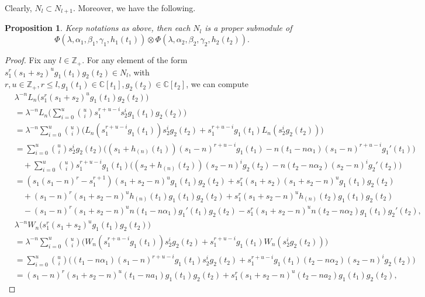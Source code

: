 \documentclass[12pt,leqno,amscd,amsfonts,amssymb]{amsart}
\def\a{\alpha}
\def\b{\beta}
\def\r{\gamma}
\def\Z{\mathbb{Z}}
\def\C{\mathbb{C}}
\numberwithin{equation}{section}
\newtheorem{prop}[theo]{Proposition}
\begin{document}
Clearly, $N_l\subset N_{l+1}$. Moreover, we have the following.
\begin{prop}\label{theo2}
Keep notations as above, then each $N_l$ is a proper submodule of  $$\Phi(\lambda,\a_1,\b_1,\r_1,h_1(t_1))\otimes\Phi(\lambda,\a_2,\b_2,\r_2,h_2(t_2)).$$
\end{prop}
\begin{proof}
Fix any $l\in\Z_+$. For any element of the form $s_1^r(s_1+s_2)^ug_1(t_1)g_2(t_2)\in N_l$, with $r, u\in\Z_+, r\leq l, g_1(t_1)\in\C[t_1], g_2(t_2)\in\C[t_2]$, we can compute
\begin{align*}
&\lambda^{-n} L_n\big( s_1^r (s_1 + s_2)^u g_1(t_1) g_2(t_2) \big)\\
&=\lambda^{-n} L_n \Big( \sum_{i=0}^u \binom{u}{i} s_1^{r+u-i} s_2^i g_1(t_1) g_2(t_2) \Big)\\
&= \lambda^{-n} \sum_{i=0}^u \binom{u}{i} \Big( L_n(s_1^{r+u-i} g_1(t_1)) s_2^i g_2(t_2)+ s_1^{r+u-i} g_1(t_1) L_n(s_2^i g_2(t_2)) \Big)\\
&=\sum_{i=0}^u \binom{u}{i}s_2^i g_2(t_2)\big((s_1+h_{(n)}(t_1))(s_1-n)^{r+u-i}g_1(t_1)-n(t_1-n\a_1)(s_1-n)^{r+u-i}g_1'(t_1)\big)\\
&\quad +\sum_{i=0}^u \binom{u}{i}s_1^{r+u-i}g_1(t_1)\big((s_2+h_{(n)}(t_2))(s_2-n)^{i}g_2(t_2)-n(t_2-n\a_2)(s_2-n)^{i}g_2'(t_2)\big)\\
&= (s_1(s_1 - n)^r-s_1^{r+1}) (s_1 + s_2 - n)^u g_1(t_1) g_2(t_2) + s_1^r (s_1+s_2) (s_1 + s_2 - n)^u g_1(t_1) g_2(t_2)\\
&\quad + (s_1 - n)^r (s_1 + s_2 - n)^u h_{(n)}(t_1) g_1(t_1) g_2(t_2) + s_1^r (s_1 + s_2 - n)^u h_{(n)}(t_2) g_1(t_1) g_2(t_2)\\
&\quad - (s_1 - n)^r (s_1 + s_2 - n)^u n (t_1 - n \a_1) g_1'(t_1) g_2(t_2) - s_1^r (s_1 + s_2 - n)^u n(t_2 -n\a_2) g_1(t_1) g_2'(t_2),
\end{align*}
\begin{align*}
&\lambda^{-n} W_n\big( s_1^r (s_1 + s_2)^u g_1(t_1) g_2(t_2) \big) &&\\
&= \lambda^{-n} \sum_{i=0}^u \binom{u}{i} \Big( W_n(s_1^{r+u-i} g_1(t_1)) s_2^i g_2(t_2) + s_1^{r+u-i} g_1(t_1) W_n(s_2^i g_2(t_2)) \Big) &&\\
&=\sum_{i=0}^u \binom{u}{i}\big((t_1-n\a_1)(s_1-n)^{r+u-i}g_1(t_1)s_2^i g_2(t_2)+s_1^{r+u-i}g_1(t_1)(t_2-n\a_2)(s_2-n)^i g_2(t_2)\big)&&\\
&= (s_1 - n)^r (s_1 + s_2 - n)^u (t_1 - n a_1) g_1(t_1) g_2(t_2) + s_1^r (s_1 + s_2 - n)^u (t_2 - na_2) g_1(t_1) g_2(t_2),

\end{align*}
\end{proof}
\end{document}
